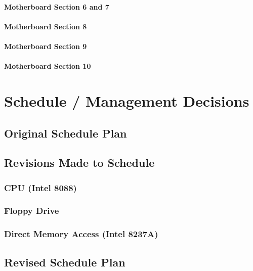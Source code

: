 \documentclass[12pt, letterpaper]{article}
\begin{document}
\paragraph{Motherboard Section 6 and 7}

\paragraph{Motherboard Section 8}

\paragraph{Motherboard Section 9}

\paragraph{Motherboard Section 10}

\section{Schedule / Management Decisions}

\subsection{Original Schedule Plan}

\subsection{Revisions Made to Schedule}

\subsubsection{CPU (Intel 8088)}

\subsubsection{Floppy Drive}

\subsubsection{Direct Memory Access (Intel 8237A)}

\subsection{Revised Schedule Plan}
\end{document}
